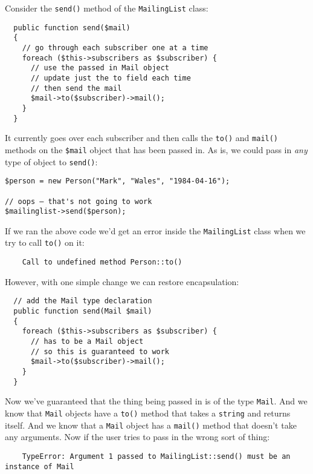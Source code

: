 Consider the \texttt{send()} method of the \texttt{MailingList} class:

\begin{verbatim}
  public function send($mail)
  {
    // go through each subscriber one at a time
    foreach ($this->subscribers as $subscriber) {
      // use the passed in Mail object
      // update just the to field each time
      // then send the mail
      $mail->to($subscriber)->mail();
    }
  }
\end{verbatim}

It currently goes over each subscriber and then calls the \texttt{to()} and \texttt{mail()} methods on the \texttt{\$mail} object that has been passed in. As is, we could pass in \textit{any} type of object to \texttt{send()}:

\begin{verbatim}
$person = new Person("Mark", "Wales", "1984-04-16");

// oops – that's not going to work
$mailinglist->send($person);
\end{verbatim}

If we ran the above code we'd get an error inside the \texttt{MailingList} class when we try to call \texttt{to()} on it:

\begin{verbatim}
    Call to undefined method Person::to()
\end{verbatim}

However, with one simple change we can restore encapsulation:

\begin{verbatim}
  // add the Mail type declaration
  public function send(Mail $mail)
  {
    foreach ($this->subscribers as $subscriber) {
      // has to be a Mail object
      // so this is guaranteed to work
      $mail->to($subscriber)->mail();
    }
  }
\end{verbatim}

Now we've guaranteed that the thing being passed in is of the type \texttt{Mail}. And we know that \texttt{Mail} objects have a \texttt{to()} method that takes a \texttt{string} and returns itself. And we know that a \texttt{Mail} object has a \texttt{mail()} method that doesn't take any arguments. Now if the user tries to pass in the wrong sort of thing:

\begin{verbatim}
    TypeError: Argument 1 passed to MailingList::send() must be an instance of Mail
\end{verbatim}

